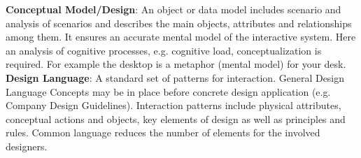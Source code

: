 \textbf{Conceptual Model/Design}: An object or data model includes scenario and analysis of scenarios and describes the main objects, attributes and relationships among them. It ensures an accurate mental model of the interactive system. Here an analysis of cognitive processes, e.g. cognitive load, conceptualization is required. For example the desktop is a metaphor (mental model) for your desk.\\ 

\textbf{Design Language}: A standard set of patterns for interaction. General Design Language Concepts may be in place before concrete design application (e.g. Company Design Guidelines). Interaction patterns include physical attributes, conceptual actions and objects, key elements of design as well as principles and rules. Common language reduces the number of elements for the involved designers.

